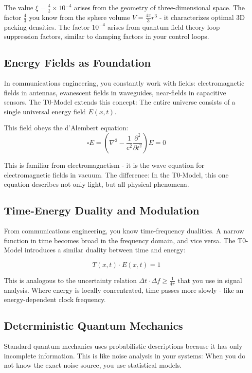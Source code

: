 The value $\xi = \frac{4}{3} \times 10^{-4}$ arises from the geometry of three-dimensional space. The factor $\frac{4}{3}$ you know from the sphere volume $V = \frac{4\pi}{3}r^3$ - it characterizes optimal 3D packing densities. The factor $10^{-4}$ arises from quantum field theory loop suppression factors, similar to damping factors in your control loops.

\subsection{Energy Fields as Foundation}

In communications engineering, you constantly work with fields: electromagnetic fields in antennas, evanescent fields in waveguides, near-fields in capacitive sensors. The T0-Model extends this concept: The entire universe consists of a single universal energy field $E(x,t)$.

This field obeys the d'Alembert equation:
$$\square E = \left(\nabla^2 - \frac{1}{c^2}\frac{\partial^2}{\partial t^2}\right) E = 0$$

This is familiar from electromagnetism - it is the wave equation for electromagnetic fields in vacuum. The difference: In the T0-Model, this one equation describes not only light, but all physical phenomena.

\subsection{Time-Energy Duality and Modulation}

From communications engineering, you know time-frequency dualities. A narrow function in time becomes broad in the frequency domain, and vice versa. The T0-Model introduces a similar duality between time and energy:

$$T(x,t) \cdot E(x,t) = 1$$

This is analogous to the uncertainty relation $\Delta t \cdot \Delta f \geq \frac{1}{4\pi}$ that you use in signal analysis. Where energy is locally concentrated, time passes more slowly - like an energy-dependent clock frequency.

\subsection{Deterministic Quantum Mechanics}

Standard quantum mechanics uses probabilistic descriptions because it has only incomplete information. This is like noise analysis in your systems: When you do not know the exact noise source, you use statistical models.

